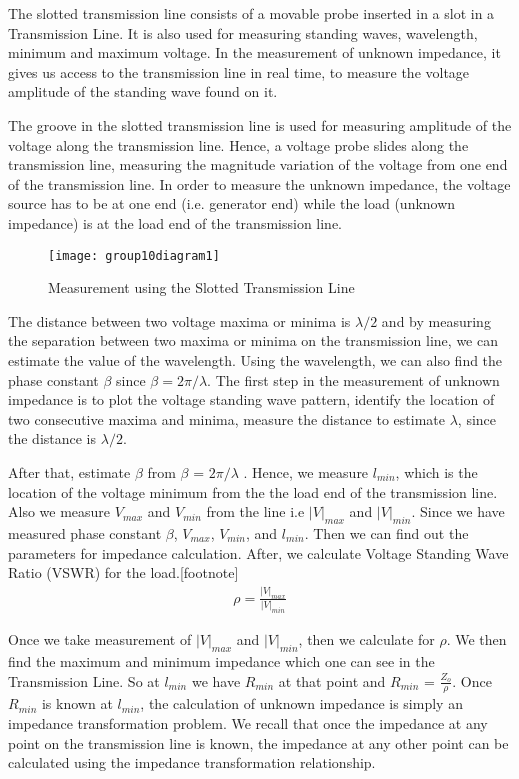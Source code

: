 The slotted transmission line consists of a movable probe inserted in a slot in a Transmission Line. It is also used for measuring standing waves, wavelength, minimum and maximum voltage. In the measurement of unknown impedance, it gives us access to the transmission line in real time, to measure the voltage amplitude of the standing wave found on it.\newline 

The groove in the slotted transmission line is used for measuring amplitude of the voltage along the transmission line. Hence, a voltage probe slides along the transmission line, measuring the magnitude variation of the voltage from one end of the transmission line. In order to measure the unknown impedance, the voltage source has to be at one end (i.e. generator end) while the load (unknown impedance) is at the load end of the transmission line.
\begin{figure}[h]
	\centering
	\texttt{[image: group10diagram1]}
	\caption{Measurement using the Slotted Transmission Line}
\end{figure}

The distance between two voltage maxima or minima is $\lambda/2$ and by measuring the separation between two maxima or minima on the transmission line, we can estimate the value of the wavelength. Using the wavelength, we can also find the phase constant $\beta$ since $\beta = 2\pi/\lambda$. The first step in the measurement of unknown impedance is to plot the voltage standing wave pattern, identify the location of two consecutive maxima and minima, measure the distance to estimate $\lambda$, since the distance is $\lambda/2$.\newline 

After that, estimate $\beta$ from $\beta$ = $2\pi/\lambda$ . Hence, we measure $l_{min}$, which is the location of the voltage minimum from the the load end of the transmission line. Also we measure $V_{max}$ and $V_{min}$ from the line i.e $|V|_{max}$ and $|V|_{min}$. Since we have measured phase constant $\beta$, $V_{max}$, $V_{min}$, and $l_{min}$. Then we can find out the parameters for impedance calculation. After, we calculate Voltage Standing Wave Ratio (VSWR) for the load.[footnote]
\begin{align}
\rho = \frac{|V|_{max}}{|V|_{min}}
\end{align}

Once we take measurement of $|V|_{max}$ and $|V|_{min}$, then we calculate for $ \rho $. We then find the maximum and minimum impedance which one can see in the Transmission Line. So at $l_{min}$ we have $R_{min}$ at that point and $R_{min}$ = $\frac{Z_{o}}{\rho}$. Once $R_{min}$ is known at $l_{min}$, the calculation of unknown impedance is simply an impedance transformation problem. We recall that once the impedance at any point on the transmission line is known, the impedance at any other point can be calculated using the impedance transformation relationship.\newline

